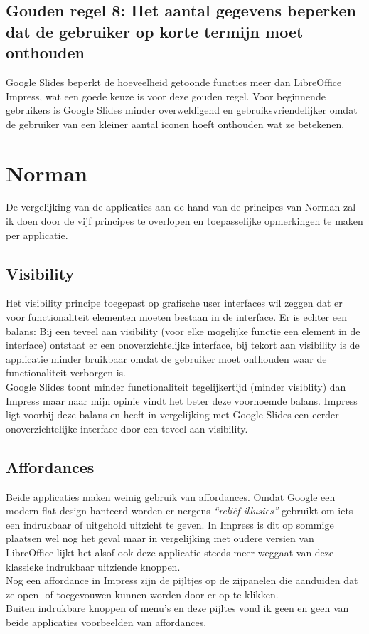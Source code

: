 \documentclass[a4paper]{article}
\begin{document}
\subsection{Gouden regel 8: Het aantal gegevens beperken dat de gebruiker op korte termijn moet onthouden}
Google Slides beperkt de hoeveelheid getoonde functies meer dan LibreOffice Impress, wat een goede keuze is voor deze gouden regel. Voor beginnende gebruikers is Google Slides minder overweldigend en gebruiksvriendelijker omdat de gebruiker van een kleiner aantal iconen hoeft onthouden wat ze betekenen.
\section{Norman}
De vergelijking van de applicaties aan de hand van de principes van Norman zal ik doen door de vijf principes te overlopen en toepasselijke opmerkingen te maken per applicatie.
\subsection{Visibility}
Het visibility principe toegepast op grafische user interfaces wil zeggen dat er voor functionaliteit elementen moeten bestaan in de interface. Er is echter een balans: Bij een teveel aan visibility (voor elke mogelijke functie een element in de interface) ontstaat er een onoverzichtelijke interface, bij tekort aan visibility is de applicatie minder bruikbaar omdat de gebruiker moet onthouden waar de functionaliteit verborgen is.\\
Google Slides toont minder functionaliteit tegelijkertijd (minder visiblity) dan Impress maar naar mijn opinie vindt het beter deze voornoemde balans. Impress ligt voorbij deze balans en heeft in vergelijking met Google Slides een eerder onoverzichtelijke interface door een teveel aan visibility. 
\subsection{Affordances}
Beide applicaties maken weinig gebruik van affordances. Omdat Google een modern flat design hanteerd worden er nergens \emph{``reli\"ef-illusies''} gebruikt om iets een indrukbaar of uitgehold uitzicht te geven. In Impress is dit op sommige plaatsen wel nog het geval maar in vergelijking met oudere versien van LibreOffice lijkt het alsof ook deze applicatie steeds meer weggaat van deze klassieke indrukbaar uitziende knoppen.\\
Nog een affordance in Impress zijn de pijltjes op de zijpanelen die aanduiden dat ze open- of toegevouwen kunnen worden door er op te klikken.\\
Buiten indrukbare knoppen of menu's en deze pijltes vond ik geen en geen van beide applicaties voorbeelden van affordances.
\end{document}
